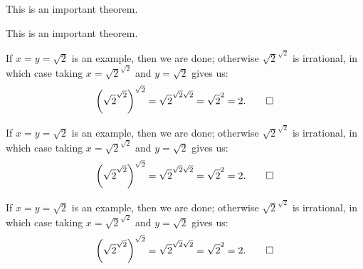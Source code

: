\begin{Theorem}
	This is an important theorem.
\end{Theorem}

\setcounter{Corollary}{0} %
\begin{Corollary}
	This is an important theorem.
\end{Corollary}

\begin{Proof*}
	If $x=y=\sqrt{2}$ is an example, then we are done; otherwise $\sqrt{2}^{\sqrt{2}}$ is irrational, in which case taking $x=\sqrt{2}^{\sqrt{2}}$ and $y=\sqrt{2}$ gives us:
	\[\bigg(\sqrt{2}^{\sqrt{2}}\bigg)^{\sqrt{2}}=\sqrt{2}^{\sqrt{2}\sqrt{2}}=\sqrt{2}^{2}=2.\qedhere\]
\end{Proof*}

\begin{Solution}
	If $x=y=\sqrt{2}$ is an example, then we are done; otherwise $\sqrt{2}^{\sqrt{2}}$ is irrational, in which case taking $x=\sqrt{2}^{\sqrt{2}}$ and $y=\sqrt{2}$ gives us:
	\[\bigg(\sqrt{2}^{\sqrt{2}}\bigg)^{\sqrt{2}}=\sqrt{2}^{\sqrt{2}\sqrt{2}}=\sqrt{2}^{2}=2.\qedhere\]
\end{Solution}

\begin{Proof}
	If $x=y=\sqrt{2}$ is an example, then we are done; otherwise $\sqrt{2}^{\sqrt{2}}$ is irrational, in which case taking $x=\sqrt{2}^{\sqrt{2}}$ and $y=\sqrt{2}$ gives us:
	\[\bigg(\sqrt{2}^{\sqrt{2}}\bigg)^{\sqrt{2}}=\sqrt{2}^{\sqrt{2}\sqrt{2}}=\sqrt{2}^{2}=2.\qedhere\]
\end{Proof}

